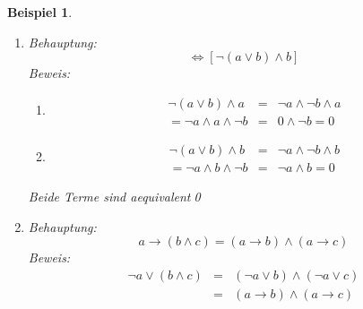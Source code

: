 \documentclass{report}
\newtheorem{myexample}{Beispiel}
\begin{document}
\begin{myexample}\begin{enumerate}
\item Behauptung: \begin{equation}[\lnot(a \lor b) \land a] \iff [\lnot (a \lor b) \land b]\end{equation}
Beweis:\begin{enumerate}
\item \begin{eqnarray}\lnot (a \lor b) \land a &=& \lnot a \land \lnot b \land a \nonumber \\
= \lnot a \land a \land \lnot b &=& 0 \land \lnot b = 0\end{eqnarray}
\item \begin{eqnarray}\lnot (a \lor b) \land b &=& \lnot a \land \lnot b \land b \nonumber \\
= \lnot a \land b \land \lnot b &=& \lnot a \land b = 0\end{eqnarray}\end{enumerate}Beide Terme sind aequivalent\qed
\item Behauptung: \begin{equation}a \to (b \land c) = (a \to b) \land (a \to c)\end{equation}
Beweis: \begin{eqnarray}\lnot a \lor (b \land c) &=& (\lnot a \lor b) \land (\lnot a \lor c) \nonumber \\
&=& (a \to b) \land (a \to c)\end{eqnarray}\end{enumerate}\end{myexample}
\end{document}

